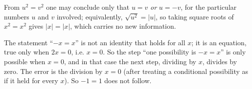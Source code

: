 From $u^2=v^2$ one may conclude only that $u=v$ \emph{or} $u=-v$, for the particular numbers $u$ and $v$ involved; equivalently, $\sqrt{u^2}=|u|$, so taking square roots of $x^2=x^2$ gives $|x|=|x|$, which carries no new information.

The statement ``$-x=x$'' is not an identity that holds for all $x$; it is an equation, true only when $2x=0$, i.e. $x=0$. So the step ``one possibility is $-x=x$'' is only possible when $x=0$, and in that case the next step, dividing by $x$, divides by zero. The error is the division by $x=0$ (after treating a conditional possibility as if it held for every $x$). So $-1=1$ does not follow.
